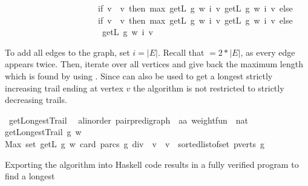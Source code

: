 \begin{isabellebody}
\ \ \ \ \ \ \ \ \ \ \ \ \ \ \ \ \ \ \ \ \ \ {\isacharparenleft}if\ v\ {\isacharequal}\ v\ then\ max\ {\isacharparenleft}{\isacharparenleft}getL\ g\ w\ i\ v\ {\isacharparenleft}getL\ g\ w\ i\ v{\isacharparenright}\ else\ \isanewline
\ \ \ \ \ \ \ \ \ \ \ \ \ \ \ \ \ \ \ \ \ \ {\isacharparenleft}if\ v\ {\isacharequal}\ v\ then\ max\ {\isacharparenleft}{\isacharparenleft}getL\ g\ w\ i\ v\ {\isacharparenleft}getL\ g\ w\ i\ v{\isacharparenright}\ else\ \isanewline
\ \ \ \ \ \ \ \ \ \ \ \ \ \ \ \ \ \ \ \ \ \ \ getL\ g\ w\ i\ v{\isacharparenright}{\isacharparenright}{\isacharparenright}{\isachardoublequoteclose}%
\begin{isamarkuptext}%
To add all edges to the graph, set $i=|E|$. Recall that  $= 2*|E|$, 
as every edge appears twice. 
Then, iterate over all vertices and give back the
maximum length which is found by using . Since  can also be used to get a longest 
strictly increasing trail ending at vertex $v$ the algorithm is not restricted to strictly decreasing trails.%
\end{isamarkuptext}\isamarkuptrue%
\isamarkupfalse%
\ getLongestTrail\ {\isacharcolon}{\isacharcolon}\ \isanewline
{\isachardoublequoteopen}{\isacharparenleft}{\isacharprime}a{\isacharcolon}{\isacharcolon}linorder{\isacharparenright}\ pair{\isacharunderscore}pre{\isacharunderscore}digraph\ {\isasymRightarrow}\ {\isacharparenleft}{\isacharprime}a{\isasymtimes}{\isacharprime}a{\isacharparenright}\ weight{\isacharunderscore}fun\ {\isasymRightarrow}\ nat{\isachardoublequoteclose}\ \isanewline
{\isachardoublequoteopen}getLongestTrail\ g\ w\ {\isacharequal}\ \isanewline
Max\ {\isacharparenleft}set\ {\isacharbrackleft}{\isacharparenleft}getL\ g\ w\ {\isacharparenleft}card\ {\isacharparenleft}parcs\ g{\isacharparenright}\ div\ {}{\isacharparenright}\ v{\isacharparenright}\ {\isachardot}\ v\ {\isacharless}{\isacharminus}\ sorted{\isacharunderscore}list{\isacharunderscore}of{\isacharunderscore}set\ {\isacharparenleft}pverts\ g{\isacharparenright}{\isacharbrackright}{\isacharparenright}{\isachardoublequoteclose}%
\begin{isamarkuptext}%
Exporting the algorithm into Haskell code results in a fully verified program to find a longest

\end{isamarkuptext}
\end{isabellebody}
